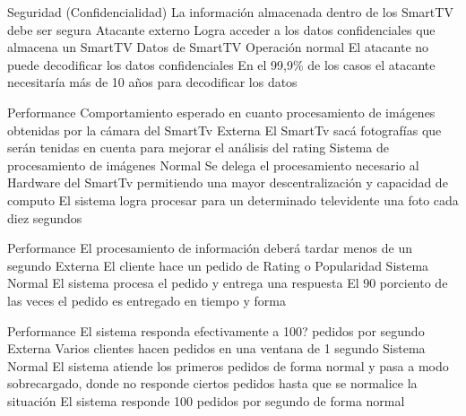 \begin{enumerate}
\QA
  {Seguridad (Confidencialidad)} %
  {La información almacenada dentro de los SmartTV debe ser segura} %
  {Atacante externo} %
  {Logra acceder a los datos confidenciales que almacena un SmartTV} %
  {Datos de SmartTV} %
  {Operación normal} %
  {El atacante no puede decodificar los datos confidenciales} %
  {En el 99,9\% de los casos el atacante necesitaría más de 10 años para decodificar los datos} %

\QA
  {Performance} %
  {Comportamiento esperado en cuanto procesamiento de imágenes obtenidas por la cámara del SmartTv} %
  {Externa} %
  {El SmartTv sacá fotografías que serán tenidas en cuenta para mejorar el análisis del rating} %
  {Sistema de procesamiento de imágenes} %
  {Normal} %
  {Se delega el procesamiento necesario al Hardware del SmartTv permitiendo una mayor descentralización y capacidad de computo} %
  {El sistema logra procesar para un determinado televidente una foto cada diez segundos} %

\QA
  {Performance} %
  {El procesamiento de información deberá tardar menos de un segundo} %
  {Externa} %
  {El cliente hace un pedido de Rating o Popularidad} %
  {Sistema} %
  {Normal} %
  {El sistema procesa el pedido y entrega una respuesta} %
  {El 90 porciento de las veces el pedido es entregado en tiempo y forma} %

\QA
  {Performance} %
  {El sistema responda efectivamente a 100? pedidos por segundo} %
  {Externa} %
  {Varios clientes hacen pedidos en una ventana de 1 segundo} %
  {Sistema} %
  {Normal} %
  {El sistema atiende los primeros pedidos de forma normal y pasa a modo sobrecargado, donde no responde ciertos pedidos hasta que se normalice la situación} %
  {El sistema responde 100 pedidos por segundo de forma normal} %

\end{enumerate}

